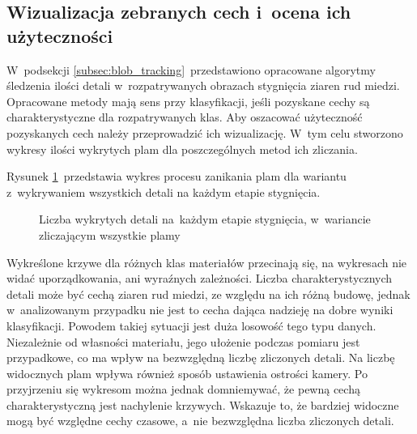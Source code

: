 \subsection{Wizualizacja zebranych cech i~ocena ich użyteczności}
\label{subsec:data_vis}
W~podsekcji \ref{subsec:blob_tracking}~przedstawiono opracowane algorytmy
śledzenia ilości detali w~rozpatrywanych obrazach stygnięcia ziaren rud miedzi.
Opracowane metody mają sens przy klasyfikacji, jeśli pozyskane cechy są
charakterystyczne dla rozpatrywanych klas.
Aby oszacować użyteczność pozyskanych cech należy przeprowadzić ich
wizualizację.
W~tym celu stworzono wykresy ilości wykrytych plam dla poszczególnych metod ich
zliczania.

Rysunek \ref{fig:blob_chart_all}~przedstawia wykres procesu zanikania plam dla
wariantu z~wykrywaniem wszystkich detali na każdym etapie stygnięcia.
\begin{figure}[tb]
    \centering
    
    \caption{Liczba wykrytych detali na~każdym etapie stygnięcia, w~wariancie
        zliczającym wszystkie plamy}
    \label{fig:blob_chart_all}
\end{figure}
Wykreślone krzywe dla różnych klas materiałów przecinają się, na wykresach nie
widać uporządkowania, ani wyraźnych zależności.
Liczba charakterystycznych detali może być cechą ziaren rud miedzi, ze względu
na ich różną budowę, jednak w~analizowanym przypadku nie jest to cecha dająca
nadzieję na dobre wyniki klasyfikacji.
Powodem takiej sytuacji jest duża losowość tego typu danych.
Niezależnie od własności materiału, jego ułożenie podczas pomiaru jest
przypadkowe, co ma wpływ na bezwzględną liczbę zliczonych detali.
Na liczbę widocznych plam wpływa również sposób ustawienia ostrości kamery.
Po przyjrzeniu się wykresom można jednak domniemywać, że pewną cechą
charakterystyczną jest nachylenie krzywych.
Wskazuje to, że bardziej widoczne mogą być względne cechy czasowe, a~nie
bezwzględna liczba zliczonych detali.

